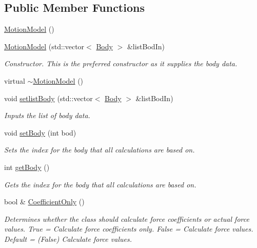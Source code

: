 \subsection*{Public Member Functions}
\begin{DoxyCompactItemize}
\item 
\hyperlink{classosea_1_1ofreq_1_1_motion_model_a5a5e4bba0f6ca24e1fdd316458f4f824}{Motion\-Model} ()
\item 
\hyperlink{classosea_1_1ofreq_1_1_motion_model_aace42c5711b5486181e986add9a72b8f}{Motion\-Model} (std\-::vector$<$ \hyperlink{classosea_1_1ofreq_1_1_body}{Body} $>$ \&list\-Bod\-In)
\begin{DoxyCompactList}\small\item\em Constructor. This is the preferred constructor as it supplies the body data. \end{DoxyCompactList}\item 
virtual \hyperlink{classosea_1_1ofreq_1_1_motion_model_ac48a359c77d9efe39d4ec8c9e862a1cd}{$\sim$\-Motion\-Model} ()
\item 
void \hyperlink{classosea_1_1ofreq_1_1_motion_model_a92f6b9639a82aef868dbaf8445276d3c}{setlist\-Body} (std\-::vector$<$ \hyperlink{classosea_1_1ofreq_1_1_body}{Body} $>$ \&list\-Bod\-In)
\begin{DoxyCompactList}\small\item\em Inputs the list of body data. \end{DoxyCompactList}\item 
void \hyperlink{classosea_1_1ofreq_1_1_motion_model_a713b903a3e78141fff2af9c045755ffb}{set\-Body} (int bod)
\begin{DoxyCompactList}\small\item\em Sets the index for the body that all calculations are based on. \end{DoxyCompactList}\item 
int \hyperlink{classosea_1_1ofreq_1_1_motion_model_a72ee8cafa92a2dee644124d051856207}{get\-Body} ()
\begin{DoxyCompactList}\small\item\em Gets the index for the body that all calculations are based on. \end{DoxyCompactList}\item 
bool \& \hyperlink{classosea_1_1ofreq_1_1_motion_model_af4d34bfa133e77f1527cee1aa36b02f4}{Coefficient\-Only} ()
\begin{DoxyCompactList}\small\item\em Determines whether the class should calculate force coefficients or actual force values. True = Calculate force coefficients only. False = Calculate force values. Default = (False) Calculate force values. \end{DoxyCompactList}\item 

\end{DoxyCompactItemize}
